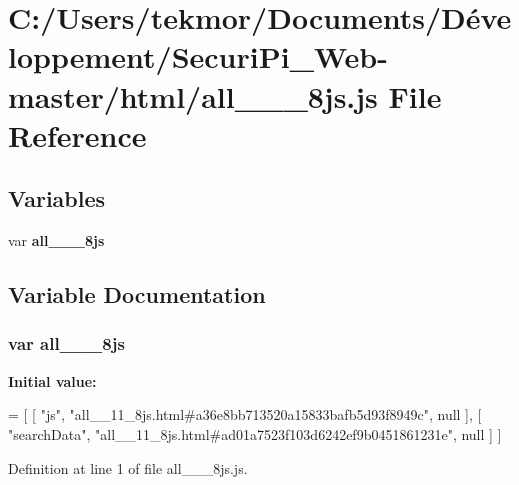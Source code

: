 \section{C\+:/\+Users/tekmor/\+Documents/\+Développement/\+Securi\+Pi\+\_\+\+Web-\/master/html/all\+\_\+\+\_\+\_\+8js.js File Reference}
\label{all____11__8js_8js}
\subsection*{Variables}
\begin{DoxyCompactItemize}
\item 
var {\bf all\+\_\+\+\_\+\_\+8js}
\end{DoxyCompactItemize}


\subsection{Variable Documentation}
\subsubsection[{all\+\_\+\+\_\+11\+\_\+8js}]{\setlength{\rightskip}{0pt plus 5cm}var all\+\_\+\+\_\+\_\+8js}\label{all____11__8js_8js_accfa54f6161e8148ccf39d71b488030d}
{\bfseries Initial value\+:}
\begin{DoxyCode}
=
[
    [ \textcolor{stringliteral}{"js"}, \textcolor{stringliteral}{"all\_\_11\_8js.html#a36e8bb713520a15833bafb5d93f8949c"}, null ],
    [ \textcolor{stringliteral}{"searchData"}, \textcolor{stringliteral}{"all\_\_11\_8js.html#ad01a7523f103d6242ef9b0451861231e"}, null ]
]
\end{DoxyCode}


Definition at line 1 of file all\+\_\+\+\_\+\_\+8js.\+js.

